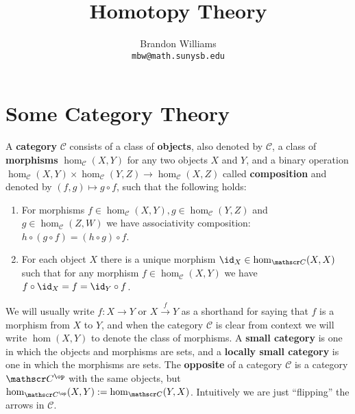 









\title{Homotopy Theory}
\author{Brandon Williams \\ \texttt{mbw@math.sunysb.edu}}
\maketitle



\tableofcontents







\newpage
\section{Some Category Theory}


A \textbf{category} $\mathscr C$ consists of a class of \textbf{objects}, also denoted by $\mathscr C$, a class of \textbf{morphisms} $\hom_{\mathscr C}(X,Y)$ for any two objects $X$ and $Y$, and a binary operation $\hom_{\mathscr C}(X,Y) \times \hom_{\mathscr C}(Y,Z) \rightarrow \hom_{\mathscr C}(X,Z)$ called \textbf{composition} and denoted by $(f,g) \mapsto g \circ f$, such that the following holds:
\begin{enumerate}
	\item For morphisms $f \in \hom_{\mathscr C}(X,Y), g \in \hom_{\mathscr C}(Y,Z)$ and $g \in \hom_{\mathscr C}(Z,W)$ we have associativity composition: $h \circ (g \circ f) = (h \circ g) \circ f$. 
	\item For each object $X$ there is a unique morphism $\id_X \in \hom_{\mathscr C}(X,X)$ such that for any morphism $f \in \hom_{\mathscr C}(X,Y)$ we have $f \circ \id_X = f = \id_Y \circ f$.
\end{enumerate}
We will usually write $f : X \rightarrow Y$ or $X \stackrel{f}{\rightarrow} Y$ as a shorthand for saying that $f$ is a morphism from $X$ to $Y$, and when the category $\mathscr C$ is clear from context we will write $\hom(X,Y)$ to denote the class of morphisms. A \textbf{small category} is one in which the objects and morphisms are sets, and a \textbf{locally small category} is one in which the morphisms are sets. The \textbf{opposite} of a category $\mathscr C$ is a category $\mathscr C^\op$ with the same objects, but $\hom_{\mathscr C^\op}(X,Y) := \hom_{\mathscr C}(Y,X)$. Intuitively we are just ``flipping'' the arrows in $\mathscr C$.

